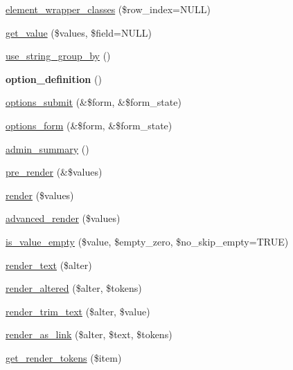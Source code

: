 \begin{DoxyCompactItemize}
\item 
\hyperlink{classviews__handler__field_a5580688b4fc24233e03ad3bc5aca26de}{element\_\-wrapper\_\-classes} (\$row\_\-index=NULL)
\item 
\hyperlink{classviews__handler__field_a293517c0221b4c11e5c353e518a271c4}{get\_\-value} (\$values, \$field=NULL)
\item 
\hyperlink{classviews__handler__field_a6ad5b2f1a4b1bc71e296a9ce16f1cf08}{use\_\-string\_\-group\_\-by} ()
\item 
\hypertarget{classviews__handler__field_a64c69a8a3697603f8283405071c25b76}{
{\bfseries option\_\-definition} ()}
\label{classviews__handler__field_a64c69a8a3697603f8283405071c25b76}

\item 
\hyperlink{classviews__handler__field_a58f6d9eb88577b3aef096386973fc9eb}{options\_\-submit} (\&\$form, \&\$form\_\-state)
\item 
\hyperlink{classviews__handler__field_a0435d161922b7b4b84f02a2e79bb947a}{options\_\-form} (\&\$form, \&\$form\_\-state)
\item 
\hyperlink{classviews__handler__field_a984d6ce9f6401260fca2d4673b27ae76}{admin\_\-summary} ()
\item 
\hyperlink{classviews__handler__field_aff134f525e1f83271183939fda4cd0e8}{pre\_\-render} (\&\$values)
\item 
\hyperlink{classviews__handler__field_a82ff951c5e9ceb97b2eab86f880cbc1e}{render} (\$values)
\item 
\hyperlink{classviews__handler__field_aeaf2c6f1ad7afa813ba64de4be3ecd58}{advanced\_\-render} (\$values)
\item 
\hyperlink{classviews__handler__field_aedcf5c58af2c99eb8363cfd63c1f86e7}{is\_\-value\_\-empty} (\$value, \$empty\_\-zero, \$no\_\-skip\_\-empty=TRUE)
\item 
\hyperlink{classviews__handler__field_a1d6e3f832a9a22410029e79cd9cfc32e}{render\_\-text} (\$alter)
\item 
\hyperlink{classviews__handler__field_aafbf9e117418a38b937ba670126215a4}{render\_\-altered} (\$alter, \$tokens)
\item 
\hyperlink{classviews__handler__field_aa2c5f49595a97848d523338a5c64a7c6}{render\_\-trim\_\-text} (\$alter, \$value)
\item 
\hyperlink{classviews__handler__field_a44eafd927c2a6d93af234f69e8560078}{render\_\-as\_\-link} (\$alter, \$text, \$tokens)
\item 
\hyperlink{classviews__handler__field_a09c76b4e29ba8b0e6694ba4e341ef609}{get\_\-render\_\-tokens} (\$item)

\end{DoxyCompactItemize}
